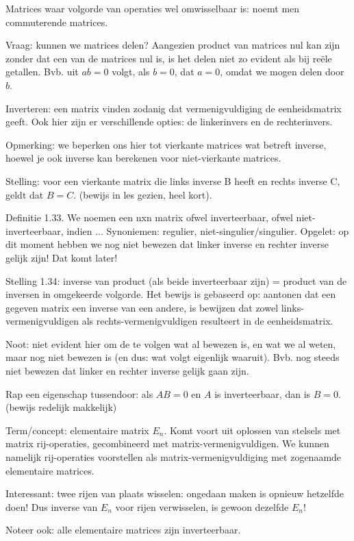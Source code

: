\documentclass{article}
\begin{document}
Matrices waar volgorde van operaties wel omwisselbaar is: noemt men commuterende matrices. 

Vraag: kunnen we matrices delen? Aangezien product van matrices nul kan zijn zonder dat een van de matrices nul is, is het delen niet zo evident als bij re{\"e}le getallen. Bvb. uit $ab=0$ volgt, als $b=0$, dat $a=0$, omdat we mogen delen door $b$. 

Inverteren: een matrix vinden zodanig dat vermenigvuldiging de eenheidsmatrix geeft. Ook hier zijn er verschillende opties: de linkerinvers en de rechterinvers. 

Opmerking: we beperken ons hier tot vierkante matrices wat betreft inverse, hoewel je ook inverse kan berekenen voor niet-vierkante matrices. 

Stelling: voor een vierkante matrix die links inverse B heeft en rechts inverse C, geldt dat $B=C$. (bewijs in les gezien, heel kort). 

Definitie 1.33. We noemen een nxn matrix ofwel inverteerbaar, ofwel niet-inverteerbaar, indien ... Synoniemen: regulier, niet-singulier/singulier. Opgelet: op dit moment hebben we nog niet bewezen dat linker inverse en rechter inverse gelijk zijn! Dat komt later! 

Stelling 1.34: inverse van product (als beide inverteerbaar zijn) =  product van de inversen in omgekeerde volgorde. Het bewijs is gebaseerd op: aantonen dat een gegeven matrix een inverse van een andere, is bewijzen dat zowel links-vermenigvuldigen als rechts-vermenigvuldigen resulteert in de eenheidsmatrix. 

Noot: niet evident hier om de te volgen wat al bewezen is, en wat we al weten, maar nog niet bewezen is (en dus: wat volgt eigenlijk waaruit). Bvb. nog steeds niet bewezen dat linker en rechter inverse gelijk gaan zijn. 

Rap een eigenschap tussendoor: als $AB=0$ en $A$ is inverteerbaar, dan is $B=0$. (bewijs redelijk makkelijk) 

Term/concept: elementaire matrix $E_n$. Komt voort uit oplossen van stelsels met matrix rij-operaties, gecombineerd met matrix-vermenigvuldigen. We kunnen namelijk rij-operaties voorstellen als matrix-vermenigvuldiging met zogenaamde elementaire matrices. 

Interessant: twee rijen van plaats wisselen: ongedaan maken is opnieuw hetzelfde doen! Dus inverse van $E_n$ voor rijen verwisselen, is gewoon dezelfde $E_n$! 

Noteer ook: alle elementaire matrices zijn inverteerbaar. 
\end{document}
